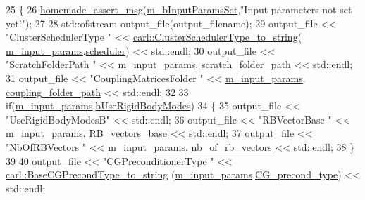 \begin{DoxyCode}
25 \{
26     \hyperlink{common__header_8h_a593ccc80b790b2268653fcf6597bf451}{homemade\_assert\_msg}(\hyperlink{classcarl_1_1_solver___files___setup_a7187af3c4a90be2d8ad2a25c11c0e910}{m\_bInputParamsSet},\textcolor{stringliteral}{"Input parameters not set
       yet!"});
27 
28     std::ofstream output\_file(output\_filename);
29     output\_file << \textcolor{stringliteral}{"ClusterSchedulerType "} << 
      \hyperlink{namespacecarl_a855a8c682ef0ee0a35f987e051d2bbf2}{carl::ClusterSchedulerType\_to\_string}(
      \hyperlink{classcarl_1_1_solver___files___setup_aa5804bf6c6e506b382766333f232d3d5}{m\_input\_params}.\hyperlink{structcarl_1_1feti__setup__init__params_ad1c1983a2374aa46f19ed79f8196f6d6}{scheduler}) << std::endl;
30     output\_file << \textcolor{stringliteral}{"ScratchFolderPath "} << \hyperlink{classcarl_1_1_solver___files___setup_aa5804bf6c6e506b382766333f232d3d5}{m\_input\_params}.
      \hyperlink{structcarl_1_1feti__setup__init__params_a57e553748427905076bae85d239f9537}{scratch\_folder\_path} << std::endl;
31     output\_file << \textcolor{stringliteral}{"CouplingMatricesFolder "} << \hyperlink{classcarl_1_1_solver___files___setup_aa5804bf6c6e506b382766333f232d3d5}{m\_input\_params}.
      \hyperlink{structcarl_1_1feti__setup__init__params_a5f710f34f0b3bdc9494c79c024fe2603}{coupling\_folder\_path} << std::endl;
32 
33     \textcolor{keywordflow}{if}(\hyperlink{classcarl_1_1_solver___files___setup_aa5804bf6c6e506b382766333f232d3d5}{m\_input\_params}.\hyperlink{structcarl_1_1feti__setup__init__params_af4191df4632d21bed2b302c08d113d14}{bUseRigidBodyModes})
34     \{
35         output\_file << \textcolor{stringliteral}{"UseRigidBodyModesB"} << std::endl;
36         output\_file << \textcolor{stringliteral}{"RBVectorBase "} << \hyperlink{classcarl_1_1_solver___files___setup_aa5804bf6c6e506b382766333f232d3d5}{m\_input\_params}.
      \hyperlink{structcarl_1_1feti__setup__init__params_aa70293e2d51c3475ebbdda0e338e8bbb}{RB\_vectors\_base} << std::endl;
37         output\_file << \textcolor{stringliteral}{"NbOfRBVectors "} << \hyperlink{classcarl_1_1_solver___files___setup_aa5804bf6c6e506b382766333f232d3d5}{m\_input\_params}.
      \hyperlink{structcarl_1_1feti__setup__init__params_a29d1a28ace280fb7fc2b7194fd9cea4a}{nb\_of\_rb\_vectors} << std::endl;
38     \}
39 
40     output\_file << \textcolor{stringliteral}{"CGPreconditionerType "} << \hyperlink{namespacecarl_ae4298594b456c7d030d5be6868d6dc63}{carl::BaseCGPrecondType\_to\_string}
      (\hyperlink{classcarl_1_1_solver___files___setup_aa5804bf6c6e506b382766333f232d3d5}{m\_input\_params}.\hyperlink{structcarl_1_1feti__setup__init__params_a118e1fe1c87a75663fb50c4545524cb8}{CG\_precond\_type}) << std::endl;

\end{DoxyCode}
